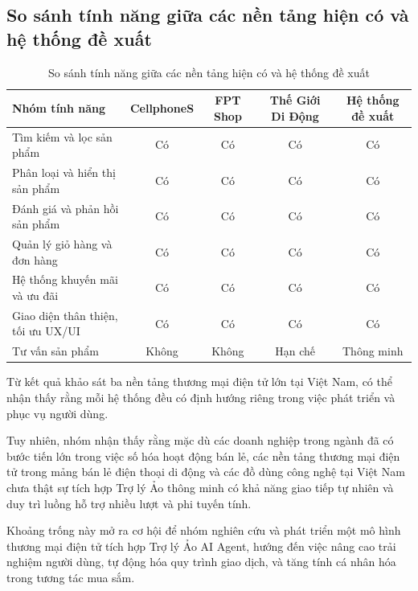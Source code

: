 \subsection{So sánh tính năng giữa các nền tảng hiện có và hệ thống đề xuất}

\begin{table}[H]
\centering
\caption{So sánh tính năng giữa các nền tảng hiện có và hệ thống đề xuất}
\renewcommand{\arraystretch}{1.5}
\begin{tabular}{|p{5.5cm}|c|c|c|c|}
\hline
\textbf{Nhóm tính năng} & \textbf{CellphoneS} & \textbf{FPT Shop} & \textbf{Thế Giới Di Động} & \textbf{Hệ thống đề xuất} \\
\hline
Tìm kiếm và lọc sản phẩm & Có & Có & Có & Có \\
\hline
Phân loại và hiển thị sản phẩm & Có & Có & Có & Có \\
\hline
Đánh giá và phản hồi sản phẩm & Có & Có & Có & Có \\
\hline
Quản lý giỏ hàng và đơn hàng & Có & Có & Có & Có \\
\hline
Hệ thống khuyến mãi và ưu đãi & Có & Có & Có & Có \\
\hline
Giao diện thân thiện, tối ưu UX/UI & Có & Có & Có & Có \\
\hline
Tư vấn sản phẩm & Không & Không & Hạn chế & Thông minh \\
\hline
\end{tabular}
\renewcommand{\arraystretch}{1.0}
\end{table}

Từ kết quả khảo sát ba nền tảng thương mại điện tử lớn tại Việt Nam, có thể nhận thấy rằng mỗi hệ thống đều có định hướng riêng trong việc phát triển và phục vụ người dùng.

Tuy nhiên, nhóm nhận thấy rằng mặc dù các doanh nghiệp trong ngành đã có bước tiến lớn trong việc số hóa hoạt động bán lẻ, các nền tảng thương mại điện tử trong mảng bán lẻ điện thoại di động và các đồ dùng công nghệ tại Việt Nam chưa thật sự tích hợp Trợ lý Ảo thông minh có khả năng giao tiếp tự nhiên và duy trì luồng hỗ trợ nhiều lượt và phi tuyến tính.

Khoảng trống này mở ra cơ hội để nhóm nghiên cứu và phát triển một mô hình thương mại điện tử tích hợp Trợ lý Ảo AI Agent, hướng đến việc nâng cao trải nghiệm người dùng, tự động hóa quy trình giao dịch, và tăng tính cá nhân hóa trong tương tác mua sắm.